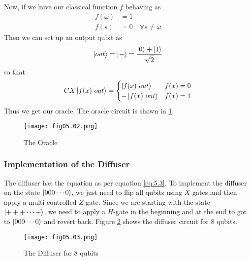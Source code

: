 Now, if we have our classical function $f$ behaving as 
\begin{equation}
\label{eq:5.6}
\begin{split}
f(\omega)&=1\\
f(s)&=0\quad\forall s\neq\omega
\end{split}
\end{equation}
Then we can set up an output qubit as
$$
\left\vert out\right\rangle=\left\vert -\right\rangle=\frac{\displaystyle \left\vert 0\right\rangle+\left\vert 1\right\rangle}{\displaystyle \sqrt{2}}
$$
so that
\begin{equation}
\label{eq:5.7}
CX\left\vert f(x)\ out\right\rangle=
\begin{cases}
\left\vert f(x)\ out\right\rangle&f(x)=0\\
-\left\vert f(x)\ out\right\rangle&f(x)=1
\end{cases}
\end{equation}
Thus we get our oracle. The oracle circuit is shown in \ref{Fig:5.2}. 
\begin{figure}[!htb]
   \begin{minipage}{\textwidth}
     \centering
     \texttt{[image: fig05.02.png]}
     \caption{The Oracle}
     \label{Fig:5.2}
   \end{minipage}
\end{figure}

\subsubsection*{Implementation of the Diffuser}
The diffuser has the equation as per equation \ref{eq:5.3}. To implement the diffuser on the state $\left\vert 000\cdots0\right\rangle$, we just need to flip all qubits using $X$ gates and then apply a multi-controlled $Z$-gate. Since we are starting with the state $\left\vert +++\cdots+\right\rangle$, we need to apply a $H$-gate in the beginning and at the end to got to $\left\vert 000\cdots0\right\rangle$ and revert back. Figure \ref{Fig:5.3} shows the diffuser circuit for 8 qubits.
\begin{figure}[!htb]
   \begin{minipage}{\textwidth}
     \centering
     \texttt{[image: fig05.03.png]}
     \caption{The Diffuser for 8 qubits}
     \label{Fig:5.3}
   \end{minipage}
\end{figure}

